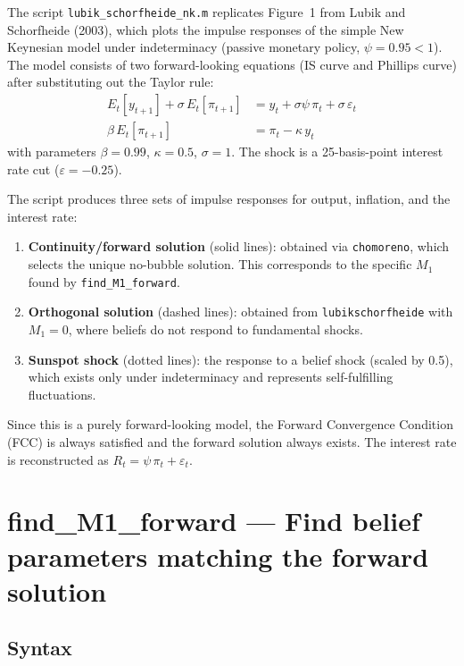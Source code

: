 \documentclass{article}
\begin{document}
The script \texttt{lubik\_schorfheide\_nk.m} replicates Figure~1 from Lubik and Schorfheide (2003), which plots the impulse responses of the simple New Keynesian model under indeterminacy (passive monetary policy, $\psi = 0.95 < 1$). The model consists of two forward-looking equations (IS curve and Phillips curve) after substituting out the Taylor rule:
\begin{align*}
E_t[y_{t+1}] + \sigma \, E_t[\pi_{t+1}] &= y_t + \sigma \psi \, \pi_t + \sigma \, \varepsilon_t \\
\beta \, E_t[\pi_{t+1}] &= \pi_t - \kappa \, y_t
\end{align*}
with parameters $\beta = 0.99$, $\kappa = 0.5$, $\sigma = 1$. The shock is a 25-basis-point interest rate cut ($\varepsilon = -0.25$).

The script produces three sets of impulse responses for output, inflation, and the interest rate:
\begin{enumerate}[nosep]
\item \textbf{Continuity/forward solution} (solid lines): obtained via \texttt{chomoreno}, which selects the unique no-bubble solution. This corresponds to the specific $M_1$ found by \texttt{find\_M1\_forward}.
\item \textbf{Orthogonal solution} (dashed lines): obtained from \texttt{lubikschorfheide} with $M_1 = 0$, where beliefs do not respond to fundamental shocks.
\item \textbf{Sunspot shock} (dotted lines): the response to a belief shock (scaled by 0.5), which exists only under indeterminacy and represents self-fulfilling fluctuations.
\end{enumerate}
Since this is a purely forward-looking model, the Forward Convergence Condition (FCC) is always satisfied and the forward solution always exists. The interest rate is reconstructed as $R_t = \psi \, \pi_t + \varepsilon_t$.

\newpage
\section{find\_M1\_forward --- Find belief parameters matching the forward solution}

\subsection{Syntax}
\end{document}
